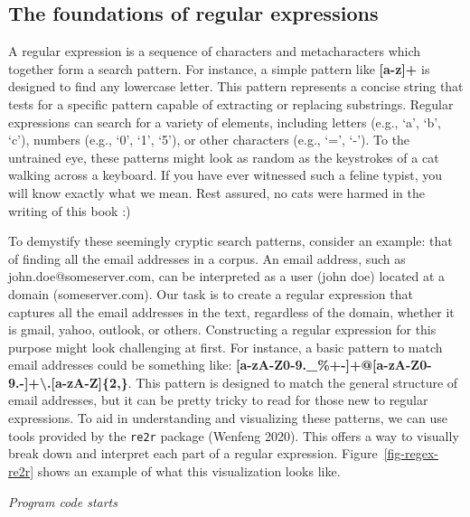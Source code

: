 \subsection{The foundations of regular
expressions}\label{foundations-of-regular-expressions}

A regular expression is a sequence of characters and metacharacters
which together form a search pattern. For instance, a simple pattern like
\textbf{{[}a-z{]}+} is designed to find any lowercase letter. This
pattern represents a concise string that tests for a specific pattern
capable of extracting or replacing substrings. Regular expressions can
search for a variety of elements, including letters (e.g., `a', `b',
`c'), numbers (e.g., `0', `1', `5'), or other characters (e.g., `=',
`-'). To the untrained eye, these patterns might look as random as the
keystrokes of a cat walking across a keyboard. If you have ever
witnessed such a feline typist, you will know exactly what we mean. Rest
assured, no cats were harmed in the writing of this book :)

To demystify these seemingly cryptic search patterns, consider an
example: that of finding all the email addresses in a corpus. An email address, such
as john.doe@someserver.com, can be interpreted as a user (john doe)
located at a domain (someserver.com). Our task is to create a regular
expression that captures all the email addresses in the text, regardless of
the domain, whether it is gmail, yahoo, outlook, or others. Constructing
a regular expression for this purpose might look challenging at first.
For instance, a basic pattern to match email addresses could be
something like:
\textbf{{[}a-zA-Z0-9.\_\%+-{]}+@{[}a-zA-Z0-9.-{]}+\textbackslash.{[}a-zA-Z{]}\{2,\}}.
This pattern is designed to match the general structure of email
addresses, but it can be pretty tricky to read for those new to regular
expressions. To aid in understanding and visualizing these patterns, we
can use tools provided by the \texttt{re2r} package (Wenfeng 2020). This offers a way to visually break down and interpret each part of a
regular expression. Figure~\ref{fig-regex-re2r} shows an example
of what this visualization looks like.

\emph{Program code starts}

\begin{Shaded}
\begin{Highlighting}[]

\NormalTok{(}\SpecialCharTok{\textbackslash{}\textbackslash{}}\SpecialCharTok{\textbackslash{}\textbackslash{}}\SpecialCharTok{\textbackslash{}\textbackslash{}}\NormalTok{)}
\end{Highlighting}
\end{Shaded}

